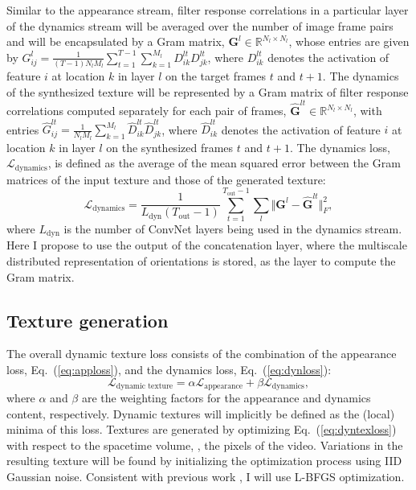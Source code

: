 Similar to the appearance stream, filter response correlations
in a particular layer of the dynamics
stream will be averaged over the number of image frame
pairs and will be encapsulated by a Gram matrix,
$\mathbf{G}^{l} \in \mathbb{R}^{N_l \times N_l}$,
whose entries are given by
$G_{ij}^l = \frac{1}{(T-1) N_l M_l} \sum_{t=1}^{T-1} \sum_{k=1}^{M_l} D_{ik}^{lt} D_{jk}^{lt}$,
where $D_{ik}^{lt}$ denotes the activation of feature $i$ at
location $k$ in layer $l$ on the target frames $t$ and $t+1$.
The dynamics of the synthesized texture will be represented
by a Gram matrix of filter response correlations 
computed separately for each pair of frames,
$\hat{\mathbf{G}}^{lt} \in \mathbb{R}^{N_l \times N_l}$,
with entries
$\hat{G}_{ij}^{lt} = \frac{1}{N_l M_l} \sum_{k=1}^{M_l} \hat{D}_{ik}^{lt} \hat{D}_{jk}^{lt}$,
where $\hat{D}_{ik}^{lt}$ denotes the activation of feature $i$ at
location $k$ in layer $l$ on the synthesized frames $t$ and $t+1$.
The dynamics loss, $\mathcal{L}_\text{dynamics}$, is defined as
the average of the mean squared error between the Gram matrices
of the input texture
and those of the generated texture:
\begin{equation}
   \mathcal{L}_\text{dynamics} = \frac{1}{L_\text{dyn} (T_\text{out}-1)}\sum_{t=1}^{T_\text{out}-1} \sum_{l}  \Vert \mathbf{G}^l - \hat{\mathbf{G}}^{lt}\Vert^2_F, \label{eq:dynloss}
\end{equation}
where $L_\text{dyn}$ is the number of ConvNet layers being used
in the dynamics stream. Here I propose to use the output of the concatenation layer,
where the multiscale distributed representation of orientations is
stored, as the layer to compute the Gram matrix.

\subsection{Texture generation}\label{sec:texgen}
The overall dynamic texture loss consists of the combination of the appearance loss, Eq.\ (\ref{eq:apploss}),
and the dynamics loss, Eq.\ (\ref{eq:dynloss}):
\begin{equation}
   \mathcal{L}_\text{dynamic texture} = \alpha\mathcal{L}_\text{appearance} + \beta \mathcal{L}_\text{dynamics}, \label{eq:dyntexloss}
\end{equation}
where $\alpha$ and $\beta$ are the weighting factors for the
appearance and dynamics content, respectively.
Dynamic textures will implicitly be defined as the (local) minima 
of this loss.
Textures are generated by optimizing Eq.\ 
(\ref{eq:dyntexloss}) with respect to the spacetime volume,
\ie, the pixels of the video.
Variations in the resulting texture will be found by initializing the
optimization process using IID Gaussian noise.
Consistent with previous work \cite{gatys2015}, I will use
L-BFGS \cite{liu1989} optimization.

